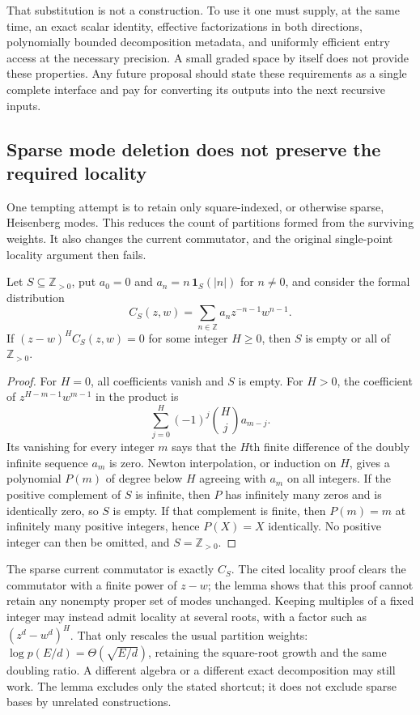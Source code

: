 That substitution is not a construction. To use it one must supply, at
the same time, an exact scalar identity, effective factorizations in
both directions, polynomially bounded decomposition metadata, and
uniformly efficient entry access at the necessary precision. A small
graded space by itself does not provide these properties. Any future
proposal should state these requirements as a single complete interface
and pay for converting its outputs into the next recursive inputs.

\subsection{Sparse mode deletion does not preserve the required locality}

One tempting attempt is to retain only square-indexed, or otherwise
sparse, Heisenberg modes. This reduces the count of partitions formed
from the surviving weights. It also changes the current commutator,
and the original single-point locality argument then fails.

\begin{lemma}
\label{lem:locality}
Let $S\subseteq\mathbb Z_{>0}$, put $a_0=0$ and
$a_n=n\,\mathbf1_S(|n|)$ for $n\ne0$, and consider the formal
distribution
\[
 C_S(z,w)=\sum_{n\in\mathbb Z}a_nz^{-n-1}w^{n-1}.
\]
If $(z-w)^H C_S(z,w)=0$ for some integer $H\ge0$, then $S$ is empty
or all of $\mathbb Z_{>0}$.
\end{lemma}

\begin{proof}
For $H=0$, all coefficients vanish and $S$ is empty. For $H>0$, the
coefficient of $z^{H-m-1}w^{m-1}$ in the product is
\[
 \sum_{j=0}^H(-1)^j\binom Hj a_{m-j}.
\]
Its vanishing for every integer $m$ says that the $H$th finite difference
of the doubly infinite sequence $a_m$ is zero. Newton interpolation, or
induction on $H$, gives a polynomial $P(m)$ of degree below $H$ agreeing
with $a_m$ on all integers. If the positive complement of $S$ is infinite,
then $P$ has infinitely many zeros and is identically zero, so $S$ is
empty. If that complement is finite, then $P(m)=m$ at infinitely many
positive integers, hence $P(X)=X$ identically. No positive integer can
then be omitted, and $S=\mathbb Z_{>0}$.
\end{proof}

The sparse current commutator is exactly $C_S$. The cited locality
proof clears the commutator with a finite power of $z-w$; the lemma
shows that this proof cannot retain any nonempty proper set of modes
unchanged. Keeping multiples of a fixed integer may instead admit
locality at several roots, with a factor such as $(z^d-w^d)^H$.
That only rescales the usual partition weights:
$\log p(E/d)=\Theta(\sqrt{E/d})$, retaining the square-root growth
and the same doubling ratio. A different algebra or a different exact
decomposition may still work. The lemma excludes only the stated
shortcut; it does not exclude sparse bases by unrelated constructions.


